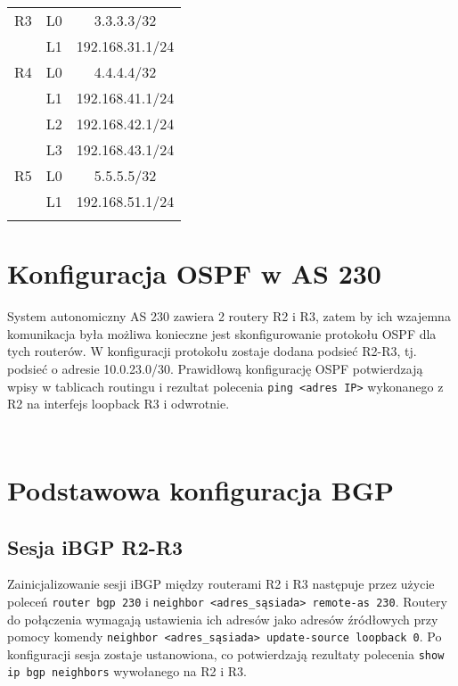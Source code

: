 \documentclass[a4paper,12pt,notitlepage]{article}
\begin{document}
\begin{table}[htbp]
{\begin{tabular}{|*3c|}
        \hline
            R3 & L0 & 3.3.3.3/32      \\
               & L1 & 192.168.31.1/24 \\
        \hline
            R4 & L0 & 4.4.4.4/32      \\
               & L1 & 192.168.41.1/24 \\
               & L2 & 192.168.42.1/24 \\
               & L3 & 192.168.43.1/24 \\
        \hline
            R5 & L0 & 5.5.5.5/32      \\
               & L1 & 192.168.51.1/24 \\
        \hhline{|===|}
    \end{tabular}}
\end{table}

\section{Konfiguracja OSPF w AS 230}

System autonomiczny AS 230 zawiera 2 routery R2 i R3, zatem by ich wzajemna komunikacja była możliwa konieczne jest skonfigurowanie protokołu OSPF dla tych routerów. W konfiguracji protokołu zostaje dodana podsieć R2-R3, tj. podsieć o adresie 10.0.23.0/30. Prawidłową konfigurację OSPF potwierdzają wpisy w tablicach routingu i rezultat polecenia \texttt{ping <adres IP>} wykonanego z R2 na interfejs loopback R3 i odwrotnie.
\inputminted[label=Pingowanie interfejsu loopback R3 z R2, firstline=178, lastline=183]{text}{Routers/R2.txt}%
\inputminted[label=Pingowanie interfejsu loopback R2 z R3, firstline=306, lastline=311]{text}{Routers/R3.txt}%

\section{Podstawowa konfiguracja BGP}

\subsection{Sesja iBGP R2-R3}

Zainicjalizowanie sesji iBGP między routerami R2 i R3 następuje przez użycie poleceń \texttt{router bgp 230} i \texttt{neighbor <adres_sąsiada> remote-as 230}. Routery do połączenia wymagają ustawienia ich adresów jako adresów źródłowych przy pomocy komendy \texttt{neighbor <adres_sąsiada> update-source loopback 0}. Po konfiguracji sesja zostaje ustanowiona, co potwierdzają rezultaty polecenia \texttt{show ip bgp neighbors} wywołanego na R2 i R3.
\inputminted[label=Stan sesji BGP po ustawieniu adresów źródłowych na R2, firstline=242, lastline=244]{text}{Routers/R2.txt}%
\inputminted[label=Stan sesji BGP po ustawieniu adresów źródłowych na R3, firstline=439, lastline=441]{text}{Routers/R3.txt}%
\end{document}
